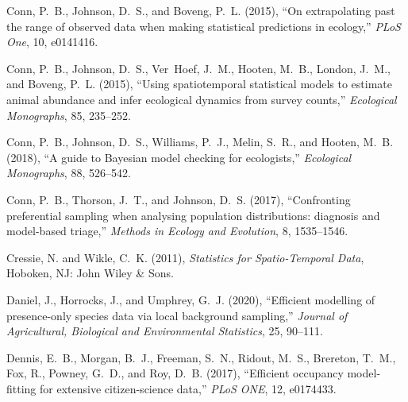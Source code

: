 \documentclass[11pt, titlepage]{article}
\begin{document}
\begin{spacing}{1.9}
\begin{flushleft}
\begin{thebibliography}{59}
Conn, P.~B., Johnson, D.~S., and Boveng, P.~L. (2015{}),
  \enquote{On extrapolating past the range of observed data when making
  statistical predictions in ecology,} \textit{PLoS One}, 10, e0141416.

Conn, P.~B., Johnson, D.~S., Ver~Hoef, J.~M., Hooten, M.~B., London, J.~M., and
  Boveng, P.~L. (2015{}), \enquote{Using spatiotemporal statistical
  models to estimate animal abundance and infer ecological dynamics from survey
  counts,} \textit{Ecological Monographs}, 85, 235--252.

Conn, P.~B., Johnson, D.~S., Williams, P.~J., Melin, S.~R., and Hooten, M.~B.
  (2018), \enquote{A guide to {Bayesian} model checking for ecologists,}
  \textit{Ecological Monographs}, 88, 526--542.

Conn, P.~B., Thorson, J.~T., and Johnson, D.~S. (2017), \enquote{Confronting
  preferential sampling when analysing population distributions: diagnosis and
  model-based triage,} \textit{Methods in Ecology and Evolution}, 8,
  1535--1546.

Cressie, N. and Wikle, C.~K. (2011), \textit{Statistics for {Spatio}-{Temporal}
  {Data}}, Hoboken, NJ: John Wiley \& Sons.

Daniel, J., Horrocks, J., and Umphrey, G.~J. (2020), \enquote{Efficient
  modelling of presence-only species data via local background sampling,}
  \textit{Journal of Agricultural, Biological and Environmental Statistics},
  25, 90--111.

Dennis, E.~B., Morgan, B.~J., Freeman, S.~N., Ridout, M.~S., Brereton, T.~M.,
  Fox, R., Powney, G.~D., and Roy, D.~B. (2017), \enquote{Efficient occupancy
  model-fitting for extensive citizen-science data,} \textit{PLoS ONE}, 12,
  e0174433.


\end{thebibliography}
\end{flushleft}
\end{spacing}
\end{document}
